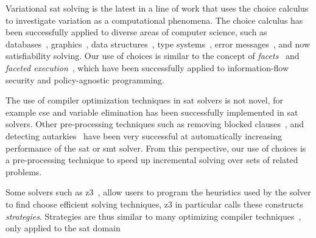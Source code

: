 Variational \ac{sat} solving is the latest in a line of work that uses the
choice calculus to investigate variation as a computational phenomena. The
choice calculus has been successfully applied to diverse areas of computer
science, such as databases~\cite{ATW17dbpl,ATW18poly},
graphics~\cite{ES18diagrams}, data
structures~\cite{MMWWK17vamos,Walk14onward,SE17fosd,EWC13fosd}, type
systems~\cite{CCEW18popl,CCW18icfp,CEW12icfp,CEW14toplas}, error
messages~\cite{CES17jvlc,CE14popl,CEW12icfp,CES14hcc}, and now satisfiability
solving.
%
Our use of choices is similar to the concept of
\textit{facets}~\cite{austin2012multiple} and \textit{faceted
execution}~\cite{Schmitz2018FacetedSM,Micinski2018AbstractingFE,10.1145/2465106.2465121},
which have been successfully applied to information-flow security and
policy-agnostic programming.
%

The use of compiler optimization techniques in \ac{sat} solvers is not novel,
for example \ac{cse} and variable elimination has been successfully implemented
in \ac{sat} solvers\cite{10.1007/11499107_5,10.1007/978-3-319-23219-5_23}. Other
pre-processing techniques such as removing blocked
clauses~\cite{10.5555/1928380.1928406}, and detecting
autarkies~\cite{10.1007/978-3-540-79719-7_18} have been very successful at
automatically increasing performance of the \ac{sat} or \ac{smt} solver. From
this perspective, our use of choices is a pre-processing technique to speed up
incremental solving over sets of related problems.

Some solvers such as z3~\cite{10.1007/978-3-540-78800-3_24}, allow users to
program the heuristics used by the solver to find choose efficient solving
techniques, z3 in particular calls these constructs \emph{strategies}.
Strategies are thus similar to many optimizing compiler
techniques~\cite{10.5555/6448}, only applied to the \ac{sat} domain

